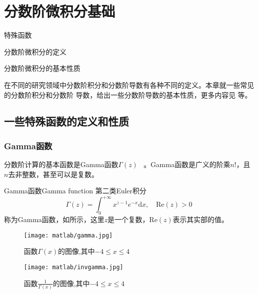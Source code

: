\chapter{分数阶微积分基础}



\begin{introduction}   
	\itemsep=1pt
	\parskip=0pt
	\item 特殊函数
	\item 分数阶微积分的定义
	\item 分数阶微积分的基本性质
\end{introduction}

在不同的研究领域中分数阶积分和分数阶导数有各种不同的定义。本章就一些常见的分数阶积分和分数阶 导数，给出一些分数阶导数的基本性质，更多内容见 \cite{Samko-1993} 等。

\section{一些特殊函数的定义和性质}	

\subsection{Gamma函数}

分数阶计算的基本函数是Gamma函数$\Gamma\left(z\right)$  ~\cite{Wiki-Gamma-Function}。Gamma函数是广义的阶乘$n!$，且$n$去非整数，甚至可以是复数。

\begin{definition}{Gamma函数}{Gamma function}
	第二类Euler积分
	\begin{equation}
	\Gamma\left(z\right) = \int_{0}^{\text{+}\infty }{x^{z-1}e^{-x}\mathrm{d}x},\quad \mathrm{Re}\left(z\right)>0
	\end{equation}
	称为Gamma函数，如所示，这里$z$是一个复数，$\mathrm{Re}\left(z\right)$表示其实部的值。
\end{definition}

\begin{figure}[ht]
	\centering
	\texttt{[image: matlab/gamma.jpg]}
	\caption{函数$\Gamma\left(x\right)$的图像,其中$-4\le x \le 4$\label{fig:gammafig}}
\end{figure}

\begin{figure}[ht]
	\centering
	\texttt{[image: matlab/invgamma.jpg]}
	\caption{函数$\frac{1}{\Gamma\left(x\right)}$的图像,其中$-4\le x \le 4$\label{fig:invgammafig}}
\end{figure}

